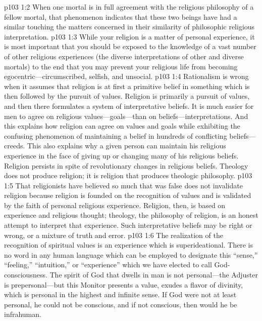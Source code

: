 \vs p103 1:2 When one mortal is in full agreement with the religious philosophy of a fellow mortal, that phenomenon indicates that these two beings have had a similar  touching the matters concerned in their similarity of philosophic religious interpretation.
\vs p103 1:3 While your religion is a matter of personal experience, it is most important that you should be exposed to the knowledge of a vast number of other religious experiences (the diverse interpretations of other and diverse mortals) to the end that you may prevent your religious life from becoming egocentric---circumscribed, selfish, and unsocial.
\vs p103 1:4 Rationalism is wrong when it assumes that religion is at first a primitive belief in something which is then followed by the pursuit of values. Religion is primarily a pursuit of values, and then there formulates a system of interpretative beliefs. It is much easier for men to agree on religious values---goals---than on beliefs---interpretations. And this explains how religion can agree on values and goals while exhibiting the confusing phenomenon of maintaining a belief in hundreds of conflicting beliefs---creeds. This also explains why a given person can maintain his religious experience in the face of giving up or changing many of his religious beliefs. Religion persists in spite of revolutionary changes in religious beliefs. Theology does not produce religion; it is religion that produces theologic philosophy.
\vs p103 1:5 That religionists have believed so much that was false does not invalidate religion because religion is founded on the recognition of values and is validated by the faith of personal religious experience. Religion, then, is based on experience and religious thought; theology, the philosophy of religion, is an honest attempt to interpret that experience. Such interpretative beliefs may be right or wrong, or a mixture of truth and error.
\vs p103 1:6 The realization of the recognition of spiritual values is an experience which is superideational. There is no word in any human language which can be employed to designate this “sense,” “feeling,” “intuition,” or “experience” which we have elected to call God\hyp{}consciousness. The spirit of God that dwells in man is not personal---the Adjuster is prepersonal---but this Monitor presents a value, exudes a flavor of divinity, which is personal in the highest and infinite sense. If God were not at least personal, he could not be conscious, and if not conscious, then would he be infrahuman.
